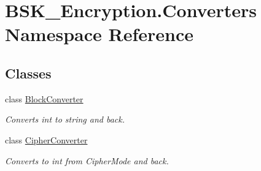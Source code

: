 \hypertarget{namespace_b_s_k___encryption_1_1_converters}{}\section{B\+S\+K\+\_\+\+Encryption.\+Converters Namespace Reference}
\label{namespace_b_s_k___encryption_1_1_converters}
\subsection*{Classes}
\begin{DoxyCompactItemize}
\item 
class \mbox{\hyperlink{class_b_s_k___encryption_1_1_converters_1_1_block_converter}{Block\+Converter}}
\begin{DoxyCompactList}\small\item\em Converts int to string and back. \end{DoxyCompactList}\item 
class \mbox{\hyperlink{class_b_s_k___encryption_1_1_converters_1_1_cipher_converter}{Cipher\+Converter}}
\begin{DoxyCompactList}\small\item\em Converts to int from Cipher\+Mode and back. \end{DoxyCompactList}\end{DoxyCompactItemize}
